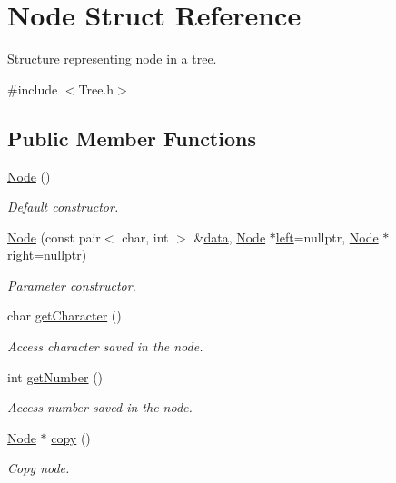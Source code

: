 \hypertarget{struct_node}{}\section{Node Struct Reference}
\label{struct_node}


Structure representing node in a tree.  




{\ttfamily \#include $<$Tree.\+h$>$}

\subsection*{Public Member Functions}
\begin{DoxyCompactItemize}
\item 
\mbox{\label{struct_node_ad7a34779cad45d997bfd6d3d8043c75f}} 
\mbox{\hyperlink{struct_node_ad7a34779cad45d997bfd6d3d8043c75f}{Node}} ()
\begin{DoxyCompactList}\small\item\em Default constructor. \end{DoxyCompactList}\item 
\mbox{\hyperlink{struct_node_aa039ff01cadc09c47e6e29ded1909172}{Node}} (const pair$<$ char, int $>$ \&\mbox{\hyperlink{struct_node_aaa1c70b22c4bea8ee8d05294b244c9c5}{data}}, \mbox{\hyperlink{struct_node}{Node}} $\ast$\mbox{\hyperlink{struct_node_ab8c667ac8fdb120ed4c031682a9cdaee}{left}}=nullptr, \mbox{\hyperlink{struct_node}{Node}} $\ast$\mbox{\hyperlink{struct_node_a7328862eaa6dea28018326549b3294d3}{right}}=nullptr)
\begin{DoxyCompactList}\small\item\em Parameter constructor. \end{DoxyCompactList}\item 
char \mbox{\hyperlink{struct_node_a5af2a6db15b8190ed18b7c608784f050}{get\+Character}} ()
\begin{DoxyCompactList}\small\item\em Access character saved in the node. \end{DoxyCompactList}\item 
int \mbox{\hyperlink{struct_node_a7fd57dccb57f67113c2894d0d52da537}{get\+Number}} ()
\begin{DoxyCompactList}\small\item\em Access number saved in the node. \end{DoxyCompactList}\item 
\mbox{\hyperlink{struct_node}{Node}} $\ast$ \mbox{\hyperlink{struct_node_a8557bfd8ff3979e326611dd919f1987d}{copy}} ()
\begin{DoxyCompactList}\small\item\em Copy node. \end{DoxyCompactList}\end{DoxyCompactItemize}
